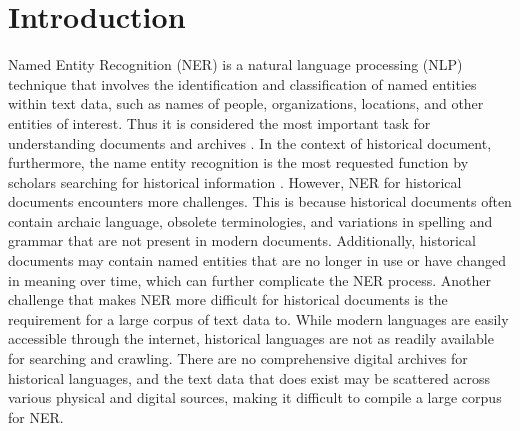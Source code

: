 \documentclass[sigconf]{acmart}
\begin{document}
  




\pagestyle{plain}
\maketitle

\section{Introduction}
Named Entity Recognition (NER) is a natural language processing (NLP) technique that involves the identification and classification of named entities within text data, such as names of people, organizations, locations, and other entities of interest. 
Thus it is considered the most important task for understanding documents and archives \cite{ref_lncs2}\cite{ref_article7}. In the context of historical document, furthermore, the name entity recognition is the most requested function by scholars searching for historical information \cite{ref_proc7}\cite{ref_article4}. However, NER for historical documents encounters more challenges. This is because historical documents often contain archaic language, obsolete terminologies, and variations in spelling and grammar that are not present in modern documents. Additionally, historical documents may contain named entities that are no longer in use or have changed in meaning over time, which can further complicate the NER process\cite{ref_article4}\cite{ref_proc9}\cite{ref_articles8}\cite{ref_proc11}\cite{ref_proc12}. Another challenge that makes NER more difficult for historical documents is the requirement for a large corpus of text data to. While modern languages are easily accessible through the internet, historical languages are not as readily available for searching and crawling. There are no comprehensive digital archives for historical languages, and the text data that does exist may be scattered across various physical and digital sources, making it difficult to compile a large corpus for NER\cite{ref_article4}\cite{ref_proc9}\cite{ref_article_labsch}. 
\end{document}
